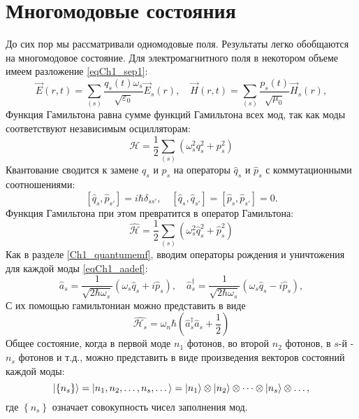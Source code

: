 \section{Многомодовые состояния}
До сих пор мы рассматривали одномодовые поля. Результаты легко
обобщаются на многомодовое состояние. Для электромагнитного поля в
некотором объеме имеем разложение \eqref{eqCh1_sep1}:
\begin{equation}
\vec{E}\left(r, t\right) = \sum_{(s)}
\frac{q_s\left(t\right) \omega_s}{\sqrt{\varepsilon_0}} \vec{E}_s\left(r\right),
\quad
\vec{H}\left(r, t\right) = \sum_{(s)}
\frac{p_s\left(t\right)}{\sqrt{\mu_0}} \vec{H}_s\left(r\right),
\end{equation}
Функция Гамильтона равна сумме функций Гамильтона всех мод, так как
моды соответствуют независимым осцилляторам: 
\begin{equation}
\mathcal{H} = \frac{1}{2} 
\sum_{(s)} \left(\omega_s^2 q_s^2 + p_s^2 \right)
\end{equation}
Квантование сводится к замене $q_s$ и $p_s$   на операторы $\hat{q}_s$
и $\hat{p}_s$ с коммутационными соотношениями: 
\begin{equation}
\left[\hat{q}_s, \hat{p}_{s'}\right] = i\hbar \delta_{ss'},
\quad 
\left[\hat{q}_s, \hat{q}_{s'}\right] = \left[\hat{p}_s,
  \hat{p}_{s'}\right] = 0.
\end{equation}
Функция Гамильтона при этом превратится в оператор Гамильтона:
\begin{equation}
\hat{\mathcal{H}} = \frac{1}{2} \sum_{(s)} \left(\omega_s^2 \hat{q}_s^2 + \hat{p}_s^2 \right)
\end{equation}
Как в разделе \ref{Ch1_quantumemf}, вводим операторы рождения и
уничтожения для каждой моды \eqref{eqCh1_aadef}: 
\begin{equation}
\hat{a}_s = \frac{1}{\sqrt{2 \hbar \omega_s}}
\left( \omega_s \hat{q}_s + i \hat{p}_s\right),
\quad
\hat{a}_s^{\dag} = \frac{1}{\sqrt{2 \hbar \omega_s}}
\left( \omega_s \hat{q}_s - i \hat{p}_s\right),
\end{equation}
С их помощью гамильтониан можно представить в виде
\begin{equation}
\hat{\mathcal{H}_s} = \omega_n \hbar 
\left(\hat{a}_s^{\dag} \hat{a}_s + \frac{1}{2}\right)
\nonumber
\end{equation}
Общее состояние, когда в первой моде $n_1$ фотонов, во второй $n_2$
фотонов, в  $s$-й - $n_s$ фотонов и т.д., можно представить в виде
произведения векторов состояний каждой моды: 
\begin{equation}
\left|\left\{n_s\right\}\right> = 
\left|n_1, n_2, \dots, n_s, \dots\right> =
\ket{n_1} \otimes
\ket{n_2} \otimes
\dots
\otimes
\ket{n_s} \otimes
\dots, 
\nonumber
\end{equation}
где $\left\{n_s\right\}$ означает совокупность чисел заполнения мод.

